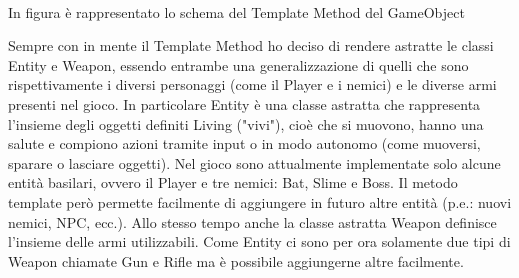 \documentclass[a4paper,12pt]{report}
\begin{document}
    \\
    \begin{center}
        In figura è rappresentato lo schema del Template Method del GameObject
    \end{center}
    \par Sempre con in mente il Template Method ho deciso di rendere astratte le classi Entity e Weapon, essendo entrambe una generalizzazione di quelli
    che sono rispettivamente i diversi personaggi (come il Player e i nemici) e le diverse armi presenti nel gioco.
    In particolare Entity è una classe astratta che rappresenta l'insieme degli oggetti definiti Living ("vivi"), cioè che si muovono, hanno una salute
    e compiono azioni tramite input o in modo autonomo (come muoversi, sparare o lasciare oggetti).
    Nel gioco sono attualmente implementate solo alcune entità basilari, ovvero il Player e tre nemici: Bat, Slime e Boss. Il metodo template però permette
    facilmente di aggiungere in futuro altre entità (p.e.: nuovi nemici, NPC, ecc.).
    Allo stesso tempo anche la classe astratta Weapon definisce l'insieme delle armi utilizzabili. Come Entity ci sono per ora solamente due tipi di Weapon
    chiamate Gun e Rifle ma è possibile aggiungerne altre facilmente.
    \\
    \par
\end{document}
